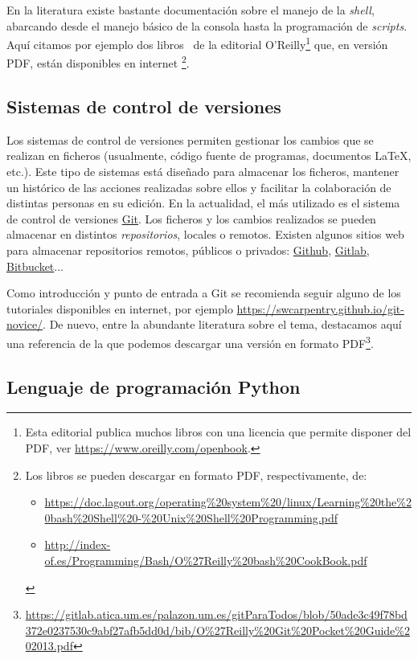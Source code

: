 En la literatura existe bastante documentación sobre el manejo de la
\textit{shell}, abarcando desde el manejo básico de la consola hasta
la programación de \textit{scripts}. Aquí citamos por ejemplo dos
libros~\cite{Newham-bash,Albing-Vosen-Bash}  de la editorial O'Reilly\footnote{Esta editorial publica muchos libros con una licencia que permite disponer del PDF, ver \url{https://www.oreilly.com/openbook}.}
que, en versión PDF, están disponibles en internet%
\footnote{Los libros se pueden descargar en formato PDF,
  respectivamente, de:
  \begin{itemize}
  \item \url{https://doc.lagout.org/operating\%20system\%20/linux/Learning\%20the\%20bash\%20Shell\%20-\%20Unix\%20Shell\%20Programming.pdf}
  \item \url{http://index-of.es/Programming/Bash/O\%27Reilly\%20bash\%20CookBook.pdf}
  \end{itemize}
  }.

\subsection{Sistemas de control de versiones}
Los sistemas de control de versiones permiten gestionar los cambios que se realizan en ficheros (usualmente, código fuente de programas, documentos \LaTeX, etc.). Este tipo de sistemas está diseñado para almacenar los ficheros, mantener un histórico de las acciones realizadas sobre ellos y facilitar la colaboración de distintas personas en su edición. En la actualidad, el más utilizado es el sistema de control de versiones \href{https://git-scm.com/}{Git}. Los ficheros y los cambios realizados se pueden almacenar en distintos \textit{repositorios}, locales o remotos. Existen algunos sitios web para almacenar repositorios remotos, públicos o privados: \href{https://github.com}{Github}, \href{https://gitlab.com/}{Gitlab}, \href{https://bitbucket.org}{Bitbucket}...

Como introducción y punto de entrada a Git se recomienda seguir alguno de los tutoriales disponibles en internet, por ejemplo \url{https://swcarpentry.github.io/git-novice/}. De nuevo, entre la abundante literatura sobre el tema, destacamos aquí una referencia de la que podemos descargar una versión en formato PDF\footnote{\url{https://gitlab.atica.um.es/palazon.um.es/gitParaTodos/blob/50ade3c49f78bd372e0237530c9abf27afb5dd0d/bib/O\%27Reilly\%20Git\%20Pocket\%20Guide\%202013.pdf}}.

\subsection{Lenguaje de programación Python}
\label{sec:python}


